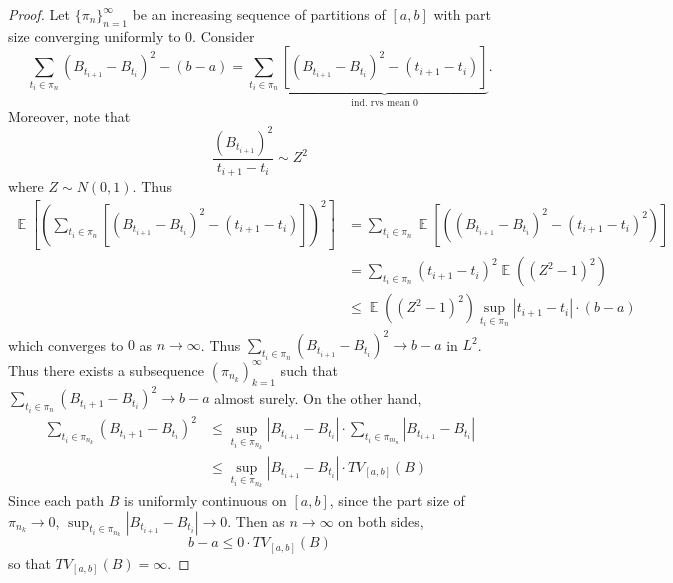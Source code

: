 \documentclass[11pt, a4paper]{memoir}
\theoremstyle{change}
\theoremstyle{plain}
\theoremstyle{nonumberplain}
\newtheorem{proof}{Proof}
\DeclareMathOperator{\E}{{\mathbb{E}}}
\numberwithin{equation}{section}
\begin{document}
\begin{proof}
    Let $\{\pi_n\}_{n=1}^\infty$ be an increasing sequence of partitions of $[a,b]$ with part size converging uniformly to 0.
    Consider
    \begin{equation*}
        \sum_{t_i\in\pi_n}(B_{t_{i+1}}-B_{t_i})^2-(b-a)=\sum_{t_i\in\pi_n}\underbrace{[(B_{t_{i+1}}-B_{t_i})^2-(t_{i+1}-t_i)]}_{\text{ind. rvs mean 0}}.
    \end{equation*}
    Moreover, note that
    \begin{equation*}
        \frac{(B_{t_{i+1}})^2}{t_{i+1}-t_i}\sim Z^2
    \end{equation*}
    where $Z\sim N(0,1)$.
    Thus
    \begin{align*}
        \E\left[\left(\sum_{t_i\in\pi_n}[(B_{t_{i+1}}-B_{t_i})^2-(t_{i+1}-t_i)]\right)^2\right] &= \sum_{t_i\in\pi_n}\E\left[\left((B_{t_{i+1}}-B_{t_i})^2-(t_{i+1}-t_i)^2\right)\right]\\
                                                                                                &= \sum_{t_i\in\pi_n}(t_{i+1}-t_i)^2\E((Z^2-1)^2)\\
                                                                                                &\leq\E((Z^2-1)^2)\sup_{t_i\in\pi_n}|t_{i+1}-t_i|\cdot(b-a)
    \end{align*}
    which converges to $0$ as $n\to\infty$.
    Thus $\sum_{t_i\in\pi_n}(B_{t_{i+1}}-B_{t_i})^2\to b-a$ in $L^2$.
    Thus there exists a subsequence $(\pi_{n_k})_{k=1}^\infty$ such that $\sum_{t_i\in\pi_n}(B_{t_i+1}-B_{t_i})^2\to b-a$ almost surely.
    On the other hand,
    \begin{align*}
        \sum_{t_i\in\pi_{n_k}}(B_{t_i+1}-B_{t_i})^2 &\leq\sup_{t_i\in\pi_{n_k}}|B_{t_{i+1}}-B_{t_i}|\cdot\sum_{t_i\in\pi_{m_n}}|B_{t_{i+1}}-B_{t_i}|\\
                                                    &\leq\sup_{t_i\in\pi_{n_k}}|B_{t_{i+1}}-B_{t_i}|\cdot TV_{[a,b]}(B)
    \end{align*}
    Since each path $B$ is uniformly continuous on $[a,b]$, since the part size of $\pi_{n_k}\to 0$, $\sup_{t_i\in\pi_{n_k}}|B_{t_{i+1}}-B_{t_i}|\to 0$.
    Then as $n\to\infty$ on both sides,
    \begin{equation*}
        b-a\leq 0\cdot TV_{[a,b]}(B)
    \end{equation*}
    so that $TV_{[a,b]}(B)=\infty$.
\end{proof}
\end{document}
